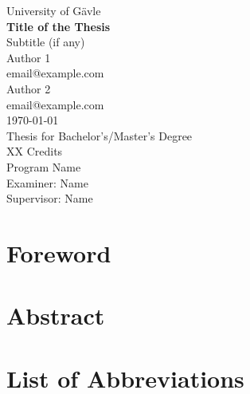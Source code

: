 \documentclass[a4paper, 12pt]{book} %
\begin{document}
\frontmatter %
\pagestyle{plain} %


\begin{titlepage} %
    \centering
    \vspace*{1cm}
    \Large University of Gävle\\[1cm]
    \Huge \textbf{Title of the Thesis}\\[0.5cm]
    \LARGE Subtitle (if any)\\[2cm]
    \Large
    Author 1\\
    email@example.com\\[1cm]
    Author 2\\
    email@example.com\\[2cm]
    \today\\[2cm]
    Thesis for Bachelor's/Master's Degree\\
    XX Credits\\
    Program Name\\[2cm]
    Examiner: Name\\
    Supervisor: Name
\end{titlepage}


\chapter*{Foreword} %
\label{sec:foreword} %

\chapter*{Abstract} %
\label{sec:abstract}



\chapter*{List of Abbreviations}
\label{sec:abbreviations}

\newpage %

\tableofcontents %
\end{document}
